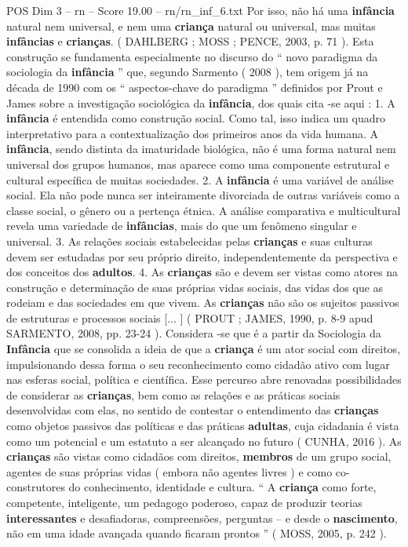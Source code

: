 \begin{textsample}{POS Dim 3 – rn – Score 19.00 – rn/rn\_inf\_6.txt}
Por isso, não há uma \textbf{infância} natural nem universal, e nem uma \textbf{criança} natural ou universal, mas muitas \textbf{infâncias} e \textbf{crianças}. ( DAHLBERG ; MOSS ; PENCE, 2003, p. 71 ).
Esta construção se fundamenta especialmente no discurso do “ novo paradigma da sociologia da \textbf{infância} ” que, segundo Sarmento ( 2008 ), tem origem já na década de 1990 com os “ aspectos-chave do paradigma ” definidos por Prout e James sobre a investigação sociológica da \textbf{infância}, dos quais cita -se aqui : 1.
A \textbf{infância} é entendida como construção social.
Como tal, isso indica um quadro interpretativo para a contextualização dos primeiros anos da vida humana.
A \textbf{infância}, sendo distinta da imaturidade biológica, não é uma forma natural nem universal dos grupos humanos, mas aparece como uma componente estrutural e cultural específica de muitas sociedades. 2.
A \textbf{infância} é uma variável de análise social.
Ela não pode nunca ser inteiramente divorciada de outras variáveis como a classe social, o gênero ou a pertença étnica.
A análise comparativa e multicultural revela uma variedade de \textbf{infâncias}, mais do que um fenômeno singular e universal. 3.
As relações sociais estabelecidas pelas \textbf{crianças} e suas culturas devem ser estudadas por seu próprio direito, independentemente da perspectiva e dos conceitos dos \textbf{adultos}. 4.
As \textbf{crianças} são e devem ser vistas como atores na construção e determinação de suas próprias vidas sociais, das vidas dos que as rodeiam e das sociedades em que vivem.
As \textbf{crianças} não são os sujeitos passivos de estruturas e processos sociais [... ] ( PROUT ; JAMES, 1990, p. 8-9 apud SARMENTO, 2008, pp. 23-24 ).
Considera -se que é a partir da Sociologia da \textbf{Infância} que se consolida a ideia de que a \textbf{criança} é um ator social com direitos, impulsionando dessa forma o seu reconhecimento como cidadão ativo com lugar nas esferas social, política e científica.
Esse percurso abre renovadas possibilidades de considerar as \textbf{crianças}, bem como as relações e as práticas sociais desenvolvidas com elas, no sentido de contestar o entendimento das \textbf{crianças} como objetos passivos das políticas e das práticas \textbf{adultas}, cuja cidadania é vista como um potencial e um estatuto a ser alcançado no futuro ( CUNHA, 2016 ).
As \textbf{crianças} são vistas como cidadãos com direitos, \textbf{membros} de um grupo social, agentes de suas próprias vidas ( embora não agentes livres ) e como co-construtores do conhecimento, identidade e cultura. “ A \textbf{criança} como forte, competente, inteligente, um pedagogo poderoso, capaz de produzir teorias \textbf{interessantes} e desafiadoras, compreensões, perguntas – e desde o \textbf{nascimento}, não em uma idade avançada quando ficaram prontos ” ( MOSS, 2005, p. 242 ).

\end{textsample}
